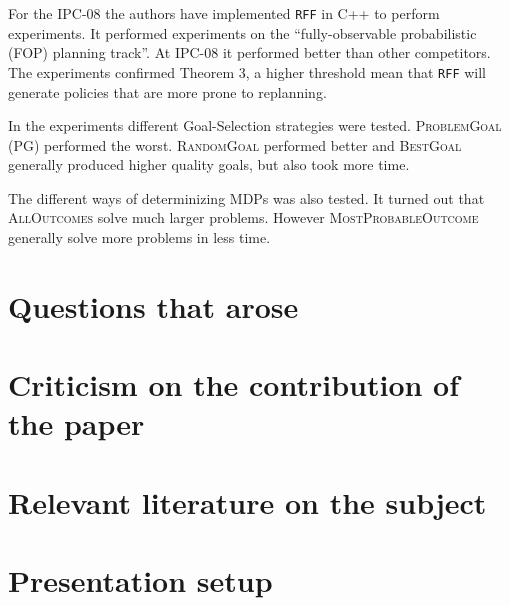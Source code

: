 \documentclass[runningheads,a4paper]{llncs}
\begin{document}
For the IPC-08 the authors have implemented \texttt{RFF} in C++ to perform
experiments. It performed experiments on the ``fully-observable probabilistic
(FOP) planning track''. At IPC-08 it performed better than other competitors.
The experiments confirmed Theorem 3, a higher threshold mean that \texttt{RFF}
will generate policies that are more prone to replanning.

In the experiments different Goal-Selection strategies were tested.
\textsc{ProblemGoal} (PG) performed the worst. \textsc{RandomGoal} performed
better and \textsc{BestGoal} generally produced higher quality goals, but also
took more time.

The different ways of determinizing MDPs was also tested. It turned out that
\textsc{AllOutcomes} solve much larger problems. However
\textsc{MostProbableOutcome} generally solve more problems in less time.

\section{Questions that arose}

\section{Criticism on the contribution of the paper}

\section{Relevant literature on the subject}

\section{Presentation setup}
\end{document}
